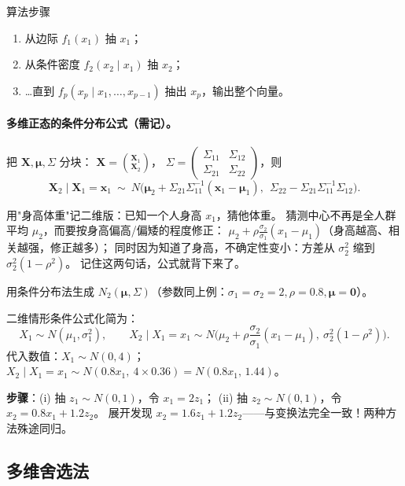 \begin{ebox}{算法步骤}
\begin{enumerate}[leftmargin=2em]
  \item 从边际 $f_1(x_1)$ 抽 $x_1$；
  \item 从条件密度 $f_2(x_2\mid x_1)$ 抽 $x_2$；
  \item \dots 直到 $f_p(x_p\mid x_1,\dots,x_{p-1})$ 抽出 $x_p$，输出整个向量。
\end{enumerate}
\end{ebox}

\paragraph{多维正态的条件分布公式（需记）。}
把 $\bm X,\bm\mu,\Sigma$ 分块：
$\bm X=\binom{\bm X_1}{\bm X_2}$，
$\Sigma=\begin{pmatrix}\Sigma_{11}&\Sigma_{12}\\\Sigma_{21}&\Sigma_{22}\end{pmatrix}$，则
\[
\bm X_2\mid\bm X_1=\bm x_1\ \sim\ N\big(\bm\mu_2+\Sigma_{21}\Sigma_{11}^{-1}(\bm x_1-\bm\mu_1),\ \ \Sigma_{22}-\Sigma_{21}\Sigma_{11}^{-1}\Sigma_{12}\big).
\]

\begin{pbox}
用"身高体重"记二维版：已知一个人身高 $x_1$，猜他体重。
猜测中心不再是全人群平均 $\mu_2$，而要按身高偏高/偏矮的程度修正：
$\mu_2+\rho\frac{\sigma_2}{\sigma_1}(x_1-\mu_1)$（身高越高、相关越强，修正越多）；
同时因为知道了身高，不确定性变小：方差从 $\sigma_2^2$ 缩到 $\sigma_2^2(1-\rho^2)$。
记住这两句话，公式就背下来了。
\end{pbox}

\begin{exbox}[条件分布法生成二维正态]
用条件分布法生成 $N_2(\bm\mu,\Sigma)$（参数同上例：$\sigma_1=\sigma_2=2,\rho=0.8,\bm\mu=\bm0$）。
\end{exbox}
\begin{sol}
二维情形条件公式化简为：
\[
X_1\sim N(\mu_1,\sigma_1^2),\qquad
X_2\mid X_1=x_1\sim N\Big(\mu_2+\rho\frac{\sigma_2}{\sigma_1}(x_1-\mu_1),\ \sigma_2^2(1-\rho^2)\Big).
\]
代入数值：$X_1\sim N(0,4)$；$X_2\mid X_1=x_1\sim N(0.8x_1,\ 4\times0.36)=N(0.8x_1,\,1.44)$。

\textbf{步骤}：(i) 抽 $z_1\sim N(0,1)$，令 $x_1=2z_1$；
(ii) 抽 $z_2\sim N(0,1)$，令 $x_2=0.8x_1+1.2z_2$。
展开发现 $x_2=1.6z_1+1.2z_2$——与变换法完全一致！两种方法殊途同归。
\end{sol}

\subsection{多维舍选法}


